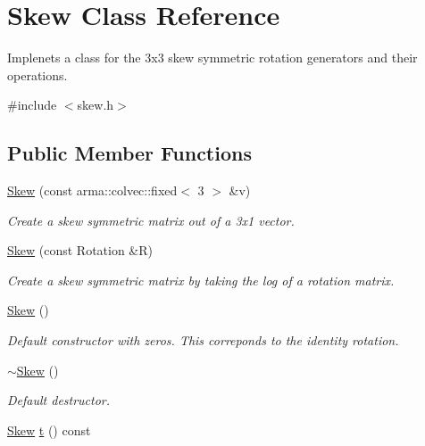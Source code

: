 \hypertarget{class_skew}{\section{Skew Class Reference}
\label{class_skew}
}


Implenets a class for the 3x3 skew symmetric rotation generators and their operations.  




{\ttfamily \#include $<$skew.\+h$>$}

\subsection*{Public Member Functions}
\begin{DoxyCompactItemize}
\item 
\hyperlink{class_skew_ac94402e87a361c0e229fa325cec71d11}{Skew} (const arma\+::colvec\+::fixed$<$ 3 $>$ \&v)
\begin{DoxyCompactList}\small\item\em Create a skew symmetric matrix out of a 3x1 vector. \end{DoxyCompactList}\item 
\hyperlink{class_skew_a7438a50cb870b524e3c440c5049e2bbb}{Skew} (const Rotation \&R)
\begin{DoxyCompactList}\small\item\em Create a skew symmetric matrix by taking the log of a rotation matrix. \end{DoxyCompactList}\item 
\hypertarget{class_skew_af0089eacd45635ee1d10a40e5e7f393b}{\hyperlink{class_skew_af0089eacd45635ee1d10a40e5e7f393b}{Skew} ()}\label{class_skew_af0089eacd45635ee1d10a40e5e7f393b}

\begin{DoxyCompactList}\small\item\em Default constructor with zeros. This correponds to the identity rotation. \end{DoxyCompactList}\item 
\hypertarget{class_skew_aa9b1176337edab3abcd3598dc28e5168}{\hyperlink{class_skew_aa9b1176337edab3abcd3598dc28e5168}{$\sim$\+Skew} ()}\label{class_skew_aa9b1176337edab3abcd3598dc28e5168}

\begin{DoxyCompactList}\small\item\em Default destructor. \end{DoxyCompactList}\item 
\hypertarget{class_skew_a53b45c74a33461f35ce73f42e6bc58bc}{\hyperlink{class_skew}{Skew} \hyperlink{class_skew_a53b45c74a33461f35ce73f42e6bc58bc}{t} () const }\label{class_skew_a53b45c74a33461f35ce73f42e6bc58bc}


\end{DoxyCompactItemize}
